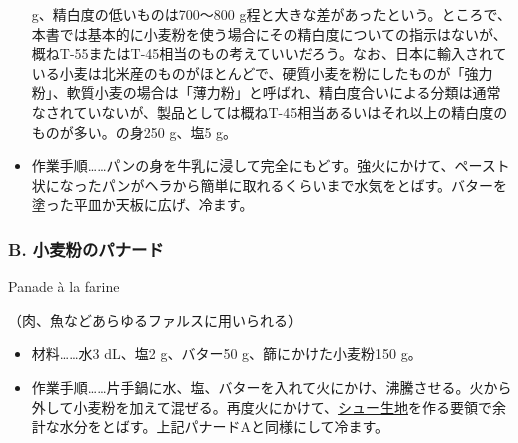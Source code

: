 \begin{recette}
\begin{itemize}
{    g、精白度の低いものは700〜800
    g程と大きな差があったという。ところで、本書では基本的に小麦粉を使う場合にその精白度についての指示はないが、概ねT-55またはT-45相当のもの考えていいだろう。なお、日本に輸入されている小麦は北米産のものがほとんどで、硬質小麦を粉にしたものが「強力粉」、軟質小麦の場合は「薄力粉」と呼ばれ、精白度合いによる分類は通常なされていないが、製品としては概ねT-45相当あるいはそれ以上の精白度のものが多い。}の身250
  g、塩5 g。
\item
  作業手順\ldots{}\ldots{}パンの身を牛乳に浸して完全にもどす。強火にかけて、ペースト状になったパンがヘラから簡単に取れるくらいまで水気をとばす。バターを塗った平皿か天板に広げ、冷ます。
\end{itemize}

\vspace*{1\zw}

\hypertarget{panade-b}{%
\subsubsection{B. 小麦粉のパナード}\label{panade-b}}

\begin{frsubenv}

Panade à la farine

\end{frsubenv}


（肉、魚などあらゆるファルスに用いられる）

\begin{itemize}
\item
  材料\ldots{}\ldots{}水3 dL、塩2 g、バター50 g、篩にかけた小麦粉150 g。
\item
  作業手順\ldots{}\ldots{}片手鍋に水、塩、バターを入れて火にかけ、沸騰させる。火から外して小麦粉を加えて混ぜる。再度火にかけて、\protect\hyperlink{pate-a-chou}{シュー生地}を作る要領で余計な水分をとばす。上記パナードAと同様にして冷ます。
\end{itemize}

\atoaki{}

\hypertarget{panade-c}{%
}
\end{recette}
